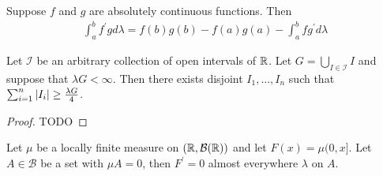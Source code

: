 \begin{cor}\label{IntegrationByParts}Suppose $f$
  and $g$ are absolutely continuous functions.  Then 
\begin{align*}
\int_a^b f^\prime g d\lambda
  = f(b)g(b) - f(a)g(a) - \int_a^b f g^\prime d \lambda
\end{align*}
\end{cor}
\begin{lem}\label{IntervalSelection}Let $\mathcal{I}$ be an arbitrary
  collection of open intervals of $\mathbb{R}$.  Let $G = \bigcup_{I \in
    \mathcal{I}} I$ and suppose that $\lambda G < \infty$.  Then there
  exists disjoint $I_1, \dots, I_n$ such that $\sum_{i=1}^n \left \vert I_i \right \vert
  \geq \frac{\lambda G}{4}$.
\end{lem}
\begin{proof}TODO
\end{proof}
\begin{lem}\label{DifferentiationOnNullSets}Let $\mu$ be a locally finite measure on $(\mathbb{R}, \mathcal{B}(\mathbb{R}))$
  and let $F(x) = \mu (0,x]$.  Let $A \in \mathcal{B}$ be a set with
  $\mu A = 0$, then $F^\prime = 0$ almost everywhere $\lambda$ on $A$.
\end{lem}
